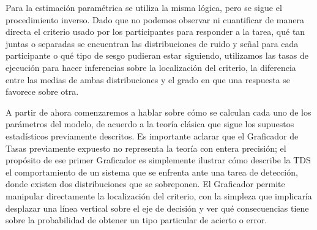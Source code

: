 Para la estimación paramétrica se utiliza la misma lógica, pero se sigue el procedimiento inverso. Dado que no podemos observar ni cuantificar de manera directa el criterio usado por los participantes para responder a la tarea, qué tan juntas o separadas se encuentran las distribuciones de ruido y señal para cada participante o qué tipo de sesgo pudieran estar siguiendo, utilizamos las tasas de ejecución para hacer inferencias sobre la localización del criterio, la diferencia entre las medias de ambas distribuciones y el grado en que una respuesta se favorece sobre otra. 

A partir de ahora comenzaremos a hablar sobre cómo se calculan cada uno de los parámetros del modelo, de acuerdo a la teoría clásica que sigue los supuestos estadísticos previamente descritos.  Es importante aclarar que el Graficador de Tasas previamente expuesto no representa la teoría con entera precisión; el propósito de ese primer Graficador es simplemente ilustrar cómo describe la TDS el comportamiento de un sistema que se enfrenta ante una tarea de detección, donde existen dos distribuciones que se sobreponen. El Graficador permite manipular directamente la localización del criterio, con la simpleza que implicaría desplazar una línea vertical sobre el eje de decisión y ver qué consecuencias tiene sobre la probabilidad de obtener un tipo particular de acierto o error.



